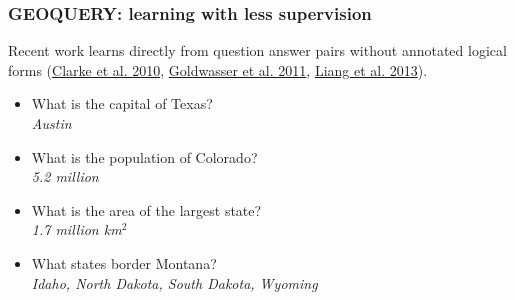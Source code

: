 \documentclass[ignorenonframetext]{beamer}
\begin{document}
\begin{frame}\frametitle{GEOQUERY: learning with less supervision}
Recent work learns directly from question answer pairs without annotated logical forms
(\href{http://aclweb.org/anthology/W/W10/W10-2903.pdf}{Clarke et al. 2010},
\href{http://www.newdesign.aclweb.org/anthology-new/P/P11/P11-1149.pdf}{Goldwasser et al. 2011},
\href{http://aclweb.org/anthology/J/J13/J13-2005.pdf}{Liang et al. 2013}).

\begin{itemize}
\item What is the capital of Texas?
\\ {\sl Austin}
\item What is the population of Colorado?
\\ {\sl 5.2 million}
\item What is the area of the largest state?
\\ {\sl 1.7 million km$^2$}
\item What states border Montana?
\\ {\sl Idaho, North Dakota, South Dakota, Wyoming}
\end{itemize}
\end{frame}
\end{document}
